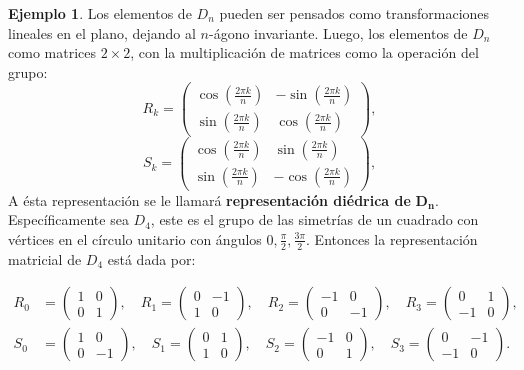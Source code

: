 \documentclass[12pt]{book}
\theoremstyle{definition}
\newtheorem{example}[theorem]{Ejemplo}
\newcounter{in}
\begin{document}
\begin{example}
Los elementos de $D_{n}$ pueden ser pensados como transformaciones lineales en el plano, dejando al $n$-ágono invariante. Luego, los elementos de $D_{n}$ como matrices $2 \times 2$, con la multiplicación de matrices como la operación del grupo:
\begin{equation*} 
R_{k} = \begin{pmatrix}
    \cos(\frac{2 \pi k}{n}) & - \sin(\frac{2 \pi k}{n}) \\
    \sin(\frac{2 \pi k}{n}) & \cos(\frac{2 \pi k}{n})
  \end{pmatrix},
\end{equation*}
\begin{equation*} 
S_{k} =  \begin{pmatrix}
    \cos(\frac{2 \pi k}{n}) &  \sin(\frac{2 \pi k}{n}) \\
    \sin(\frac{2 \pi k}{n}) & - \cos(\frac{2 \pi k}{n})
  \end{pmatrix},
\end{equation*}
A ésta representación se le llamará \textbf{representación diédrica de} $\mathbf{D_{n}}$.
Específicamente sea $D_{4}$, este es el grupo de las simetrías de un cuadrado con vértices en el círculo unitario con ángulos $0, \frac{\pi}{2}, \frac{3 \pi}{2}$.
Entonces la representación matricial de $D_{4}$ está dada por:
\begin{center}
\begin{equation*}
\begin{aligned}
R_{0} & = \begin{pmatrix}
    1 & 0 \\
    0 & 1
    \end{pmatrix}, \quad
R_{1} = \begin{pmatrix}
    0 & -1 \\
    1 & 0
    \end{pmatrix}, \quad
R_{2} = \begin{pmatrix}
    -1 & 0 \\
    0 & -1
    \end{pmatrix}, \quad
R_{3} = \begin{pmatrix}
    0 & 1 \\
    -1 & 0
    \end{pmatrix}, \quad \\
S_{0} & = \begin{pmatrix}
    1 & 0 \\
    0 & -1
    \end{pmatrix}, \quad
S_{1} = \begin{pmatrix}
    0 & 1 \\
    1 & 0
    \end{pmatrix}, \quad
S_{2} = \begin{pmatrix}
    -1 & 0 \\
    0 & 1
    \end{pmatrix}, \quad
S_{3} = \begin{pmatrix}
    0 & -1 \\
    -1 & 0
    \end{pmatrix}.
\end{aligned}
\end{equation*} 
\end{center}



\end{example}
\end{document}
